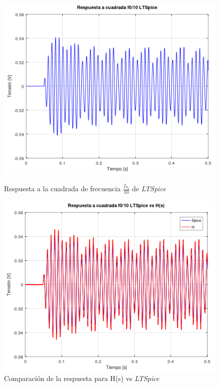 \documentclass[11pt,a4paper]{report}
\begin{document}
\begin{figure}[h!]
\centering
\includegraphics[scale=0.9]{rtaCuadradaBaja2Spice.png}
\caption{Respuesta a la cuadrada de frecuencia $\frac{f_{0_{2}}}{10}$ de \textit{LTSpice}}
\includegraphics[scale=0.85]{rtaCuadradaBaja2SpiceComp.png}
\caption{Comparación de la respuesta para H(s) vs \textit{LTSpice}}
\end{figure}
\newpage 
\end{document}
